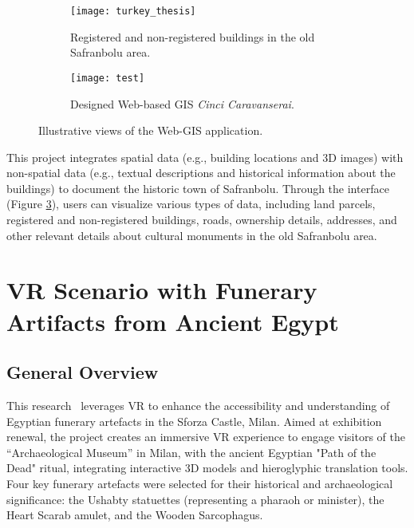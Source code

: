 \begin{figure}[h!]
  \centering
  \begin{subfigure}[b]{0.45\textwidth}
      \centering
      \texttt{[image: turkey\_thesis]}
      \caption{Registered and non-registered buildings in the old Safranbolu area.}
      \label{fig:x}
  \end{subfigure}
  \hfill
  \begin{subfigure}[b]{0.45\textwidth}
      \centering
      \texttt{[image: test]}
      \caption{Designed Web-based \gls{GIS} \textit{Cinci Caravanserai}.}
      \label{fig:y}
  \end{subfigure}
     \caption{Illustrative views of the Web-\gls{GIS} application.}
     \label{fig:z}
\end{figure}
\FloatBarrier

This project integrates spatial data (e.g., building locations and \gls{3D} images) with non-spatial data (e.g., textual descriptions and historical information about the buildings) to document the historic town of Safranbolu. 
Through the interface (Figure \ref{fig:z}), users can visualize various types of data, including land parcels, registered and non-registered buildings, roads, ownership details, addresses, and other relevant details about cultural monuments in the old Safranbolu area.

\section{\gls{VR} Scenario with Funerary Artifacts from Ancient Egypt} 
\label{sec:3d_vr_devices}

\subsection*{General Overview}

This research~\cite{gonizzi20153d} leverages \gls{VR} to enhance the accessibility and understanding of Egyptian funerary artefacts in the Sforza Castle, Milan. 
Aimed at exhibition renewal, the project creates an immersive \gls{VR} experience to engage visitors of the “Archaeological Museum” in Milan, with the ancient Egyptian "Path of the Dead" ritual, integrating interactive \gls{3D} models and hieroglyphic translation tools. 
Four key funerary artefacts were selected for their historical and archaeological significance: the Ushabty statuettes (representing a pharaoh or minister), the Heart Scarab amulet, and the Wooden Sarcophagus.

